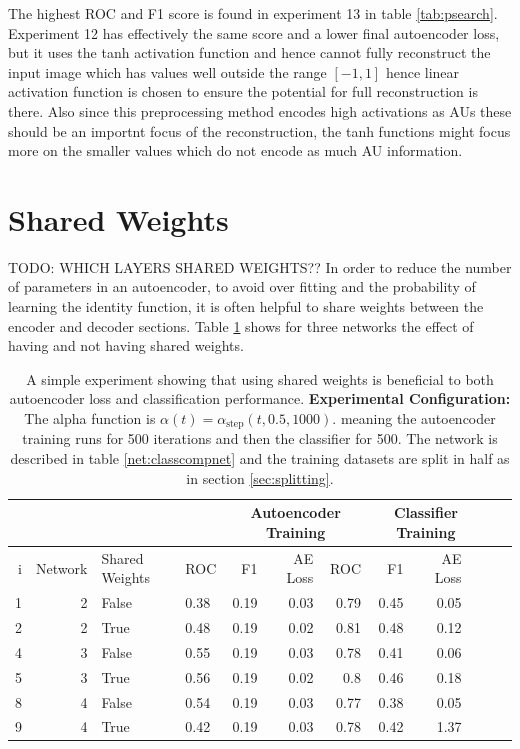 
      The highest ROC and F1 score is found in experiment 13 in table \ref{tab:psearch}. Experiment 12
      has effectively the same score and a lower final autoencoder loss, but it uses the tanh activation
      function and hence cannot fully reconstruct the input image which has values well outside the
      range $[-1,1]$ hence linear activation function is chosen to ensure the potential for full reconstruction is there.
      Also since this preprocessing method encodes high activations as AUs these should be
      an importnt focus of the reconstruction, the tanh functions might focus more on the smaller values which
      do not encode as much AU information.

    \newpage
    \section{Shared Weights}
      {\color{red}TODO: WHICH LAYERS SHARED WEIGHTS??}
      In order to reduce the number of parameters in an autoencoder, to avoid over fitting
      and the probability of learning the identity function, it is often helpful to share weights
      between the encoder and decoder sections.
      Table \ref{tab:sharedweights} shows
      for three networks the effect of having and not having shared weights.

      \begin{table}[!h] \centering
      {\footnotesize
      \begin{tabular}{rrllrrrrrrrr}
        &&&&   \multicolumn{3}{|c|}{Autoencoder Training} &  \multicolumn{3}{c|}{Classifier Training}    \\
      \hline
        i & Network               &   Shared Weights &    ROC&F1&AE Loss & ROC & F1 & AE Loss \\
      \hline
       1 & 2    & False     &    0.38 &   0.19 &     0.03 &    0.79 &   0.45 &     0.05 \\
       2 & 2    & True      &    0.48 &   0.19 &     0.02 &    0.81 &   0.48 &     0.12 \\
      \hline
      4 & 3    & False     &    0.55 &   0.19 &     0.03 &    0.78 &   0.41 &     0.06 \\
      5 & 3    & True      &    0.56 &   0.19 &     0.02 &    0.8  &   0.46 &     0.18 \\
      \hline
      8 & 4     & False     &    0.54 &   0.19 &     0.03 &    0.77 &   0.38 &     0.05 \\
      9 & 4     & True      &    0.42 &   0.19 &     0.03 &    0.78 &   0.42 &     1.37 \\
       \hline
     \end{tabular}}\caption{A simple experiment showing that using shared weights is beneficial
     to both autoencoder loss and classification performance. {\bf Experimental Configuration:}
      The alpha function is $\alpha(t)=\alpha_{\text{step}}(t,0.5,1000)$.
      meaning the autoencoder training runs for 500 iterations and then the classifier for 500.
      The network is described in table \ref{net:classcompnet} and the training datasets are split in half as in section
      \ref{sec:splitting}.} \label{tab:sharedweights} \end{table}

